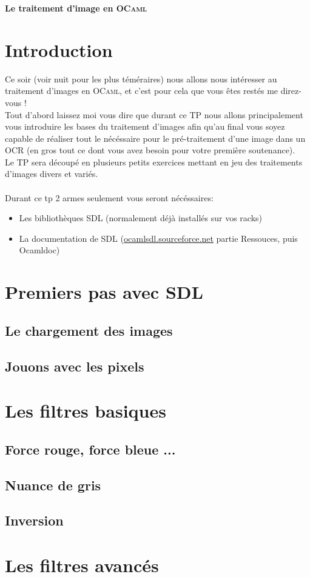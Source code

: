 \documentclass[a4paper]{article}
\begin{document}
\begin{center}
  {\Large {\bf Le traitement d'image en
  \textsc{OCaml}}}
\end{center}

\bigskip

\section*{Introduction}

Ce soir (voir nuit pour les plus téméraires) nous allons nous intéresser au traitement d'images en \textsc{OCaml}, et c'est pour cela que 
vous êtes restés me direz-vous !\\
Tout d'abord laissez moi vous dire que durant ce TP nous allons principalement vous introduire les
 bases du traitement d'images afin qu'au final vous soyez capable de réaliser tout le nécéssaire
 pour le pré-traitement d'une image dans un OCR (en gros tout ce dont vous avez besoin pour votre première soutenance).\\
Le TP sera découpé en plusieurs petits exercices mettant en jeu des traitements d'images divers et variés.\\\\
Durant ce tp 2 armes seulement vous seront nécéssaires:
\begin{itemize}
\item Les bibliothèques SDL (normalement déjà installés sur vos racks)
\item La documentation de SDL (\url{ocamlsdl.sourceforce.net} partie Ressouces, puis Ocamldoc)
\end{itemize}

\section{Premiers pas avec SDL}
\subsection{Le chargement des images}
\subsection{Jouons avec les pixels}
\section{Les filtres basiques}
\subsection{Force rouge, force bleue ...}
\subsection{Nuance de gris}
\subsection{Inversion}
\section{Les filtres avancés}
\end{document}
